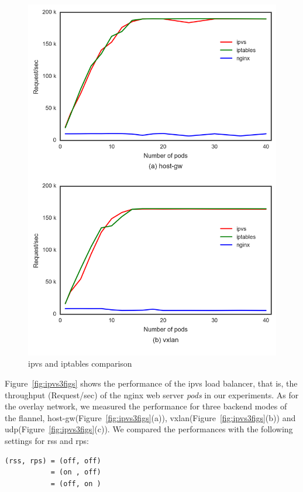 \begin{figure}
\includegraphics[width=\columnwidth]{Figs/ipvs-iptables-nginx_2figs}
\caption{ipvs and iptables comparison}
\label{fig:ipvs-iptables-nginx_2figs}
\end{figure}


Figure~\ref{fig:ipvs3figs} shows the performance of the ipvs load balancer, that is, 
the throughput (Request/sec) of the nginx web server {\em pods} in our experiments.
As for the overlay network, we measured the performance for three backend modes of the flannel, 
host-gw(Figure~\ref{fig:ipvs3figs}(a)), vxlan(Figure~\ref{fig:ipvs3figs}(b)) and udp(Figure~\ref{fig:ipvs3figs}(c)).
We compared the performances with the following settings for rss and rps: 

\begin{center}
\begin{minipage}{0.8\columnwidth}
\begin{verbatim}
(rss, rps) = (off, off)
           = (on , off)
           = (off, on )
\end{verbatim}
\end{minipage}
\end{center}

